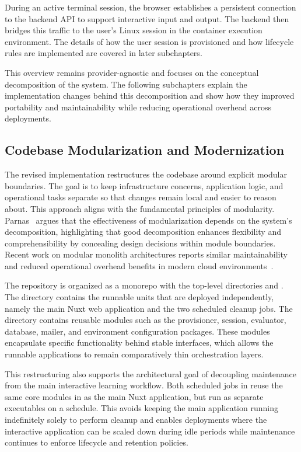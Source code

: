 During an active terminal session, the browser establishes a persistent connection to the backend API to support interactive input and output.
The backend then bridges this traffic to the user's Linux session in the container execution environment.
The details of how the user session is provisioned and how lifecycle rules are implemented are covered in later subchapters.

This overview remains provider-agnostic and focuses on the conceptual decomposition of the system.
The following subchapters explain the implementation changes behind this decomposition and show how they improved portability and maintainability while reducing operational overhead across deployments.

\subsection{Codebase Modularization and Modernization} \label{subsec:codebase-modularization-and-modernization}
The revised implementation restructures the codebase around explicit modular boundaries.
The goal is to keep infrastructure concerns, application logic, and operational tasks separate so that changes remain local and easier to reason about.
This approach aligns with the fundamental principles of modularity.
Parnas~\cite{parnas_criteria_1972} argues that the effectiveness of modularization depends on the system's decomposition, highlighting that good decomposition enhances flexibility and comprehensibility by concealing design decisions within module boundaries.
Recent work on modular monolith architectures reports similar maintainability and reduced operational overhead benefits in modern cloud environments~\cite{al-qoran_modular_2025}.

The repository is organized as a monorepo with the top-level directories  and .
The  directory contains the runnable units that are deployed independently, namely the main Nuxt web application and the two scheduled cleanup jobs.
The  directory contains reusable modules such as the provisioner, session, evaluator, database, mailer, and environment configuration packages.
These modules encapsulate specific functionality behind stable interfaces, which allows the runnable applications to remain comparatively thin orchestration layers.

This restructuring also supports the architectural goal of decoupling maintenance from the main interactive learning workflow.
Both scheduled jobs in  reuse the same core modules in  as the main Nuxt application, but run as separate executables on a schedule.
This avoids keeping the main application running indefinitely solely to perform cleanup and enables deployments where the interactive application can be scaled down during idle periods while maintenance continues to enforce lifecycle and retention policies.

